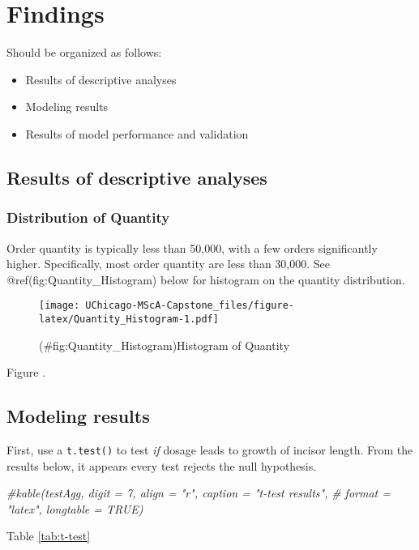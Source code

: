 \documentclass[12pt,oneside]{chicagocapstone}
\newenvironment{Shaded}{\begin{snugshade}}{\end{snugshade}}
\newcommand{\CommentTok}[1]{\textcolor[rgb]{0.56,0.35,0.01}{\textit{#1}}}
\providecommand{\tightlist}{%
  \setlength{\itemsep}{0pt}\setlength{\parskip}{0pt}}
\begin{document}
\chapter*{Findings}\label{findings}

Should be organized as follows:
\begin{itemize}
\tightlist
\item
  Results of descriptive analyses
\item
  Modeling results
\item
  Results of model performance and validation
\end{itemize}
\section*{Results of descriptive analyses}\label{findings-descriptive}

\subsection{Distribution of Quantity}\label{distribution-of-quantity}

Order quantity is typically less than 50,000, with a few orders
significantly higher. Specifically, most order quantity are less than
30,000. See @ref(fig:Quantity\_Histogram) below for histogram on the
quantity distribution.
\begin{figure}
\centering
\texttt{[image: UChicago-MScA-Capstone\_files/figure-latex/Quantity\_Histogram-1.pdf]}
\caption{(\#fig:Quantity\_Histogram)Histogram of Quantity}
\end{figure}
Figure .

\section*{Modeling results}\label{modeling-results}

First, use a \texttt{t.test()} to test \emph{if} dosage leads to growth
of incisor length. From the results below, it appears every test rejects
the null hypothesis.
\begin{Shaded}
\begin{Highlighting}[]
\CommentTok{#kable(testAgg, digit = 7, align = "r", caption = "t-test results", }
\CommentTok{#      format = "latex", longtable = TRUE)}
\end{Highlighting}
\end{Shaded}
Table \ref{tab:t-test}
\end{document}
